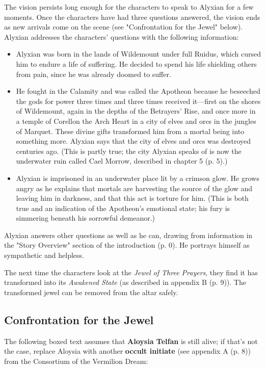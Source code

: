 \documentclass[a4paper, 11pt, bg=full, twocolumn, nooutline]{dndbook}
\begin{document}
The vision persists long enough for the characters to speak to Alyxian for a few moments. Once the characters have had three questions answered, the vision ends as new arrivals come on the scene (see "Confrontation for the Jewel" below). Alyxian addresses the characters' questions with the following information:

\begin{itemize}
\item Alyxian was born in the lands of Wildemount under full Ruidus, which cursed him to endure a life of suffering. He decided to spend his life shielding others from pain, since he was already doomed to suffer.
\item He fought in the Calamity and was called the Apotheon because he beseeched the gods for power three times and three times received it---first on the shores of Wildemount, again in the depths of the Betrayers' Rise, and once more in a temple of Corellon the Arch Heart in a city of elves and orcs in the jungles of Marquet. These divine gifts transformed him from a mortal being into something more. Alyxian says that the city of elves and orcs was destroyed centuries ago. (This is partly true; the city Alyxian speaks of is now the underwater ruin called Cael Morrow, described in chapter 5 (p. 5).)
\item Alyxian is imprisoned in an underwater place lit by a crimson glow. He grows angry as he explains that mortals are harvesting the source of the glow and leaving him in darkness, and that this act is torture for him. (This is both true and an indication of the Apotheon's emotional state; his fury is simmering beneath his sorrowful demeanor.)
\end{itemize}

Alyxian answers other questions as well as he can, drawing from information in the "Story Overview" section of the introduction (p. 0). He portrays himself as sympathetic and helpless.

The next time the characters look at the \textit{Jewel of Three Prayers}, they find it has transformed into its \textit{Awakened State} (as described in appendix B (p. 9)). The transformed jewel can be removed from the altar safely.

\subsection{Confrontation for the Jewel}

The following boxed text assumes that \textbf{Aloysia Telfan} is still alive; if that's not the case, replace Aloysia with another \textbf{occult initiate} (see appendix A (p. 8)) from the Consortium of the Vermilion Dream:
\end{document}
